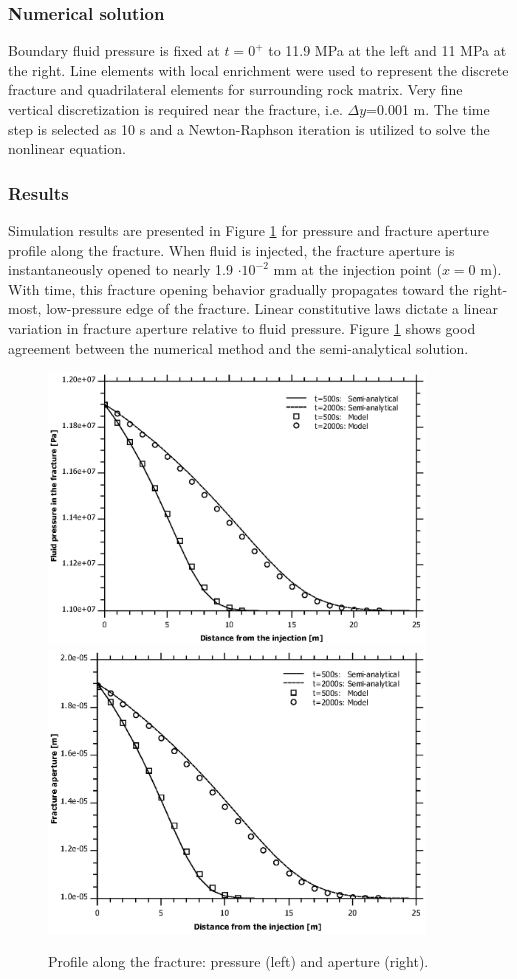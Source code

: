 \subsubsection*{Numerical solution}
Boundary fluid pressure is fixed at $t=0^+$ to 11.9 MPa at the left and 11 MPa at the right. Line elements with local enrichment were used to represent the discrete fracture and quadrilateral elements for surrounding rock matrix. Very fine vertical discretization is required near the fracture, i.e. $\Delta y$=0.001 m. The time step is selected as 10 s and a Newton-Raphson iteration is utilized to solve the nonlinear equation. 

\subsubsection*{Results}
Simulation results are presented in Figure \ref{fig:ex_hm_single_result} for pressure and fracture aperture profile along the fracture. When fluid is injected, the fracture aperture is instantaneously opened to nearly 1.9 $\cdot 10^{-2}$ mm at the injection point ($x = 0$ m). With time, this fracture opening behavior gradually propagates toward the right-most, low-pressure edge of the fracture. Linear constitutive laws dictate a linear variation in fracture aperture relative to fluid pressure.
Figure \ref{fig:ex_hm_single_result} shows good agreement between the  numerical method and the semi-analytical solution.

\begin{figure}[!tbh]
\centering
\includegraphics[width=100mm]{chapter_14/figures/fig_14_4_27_a}
\includegraphics[width=100mm]{chapter_14/figures/fig_14_4_27_b}
\caption{Profile along the fracture: pressure (left) and aperture (right).}
\label{fig:ex_hm_single_result}
\end{figure}
